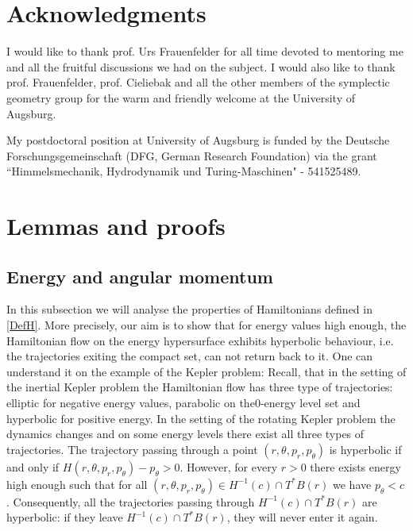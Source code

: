 \documentclass[a4paper]{amsart}
\numberwithin{equation}{section}
\begin{document}

\section*{Acknowledgments}
I would like to thank prof. Urs Frauenfelder for all time devoted to mentoring me and all the fruitful discussions we had on the subject. I would also like to thank prof. Frauenfelder, prof. Cieliebak and all the other members of the symplectic geometry group for the warm and friendly welcome at the University of Augsburg.

My postdoctoral position at University of Augsburg is funded by the Deutsche Forschungsgemeinschaft (DFG, German Research Foundation) via the grant ``Himmelsmechanik, Hydrodynamik und Turing-Maschinen" - 541525489.


\section{Lemmas and proofs}
\subsection{Energy and angular momentum}\label{ssec:E&P}

In this subsection we will analyse the properties of Hamiltonians defined in \eqref{DefH}. More precisely, our aim is to show that for energy values high enough, the Hamiltonian flow on the energy hypersurface exhibits hyperbolic behaviour, i.e. the trajectories exiting the compact set, can not return back to it. One can understand it on the example of the Kepler problem: Recall, that in the setting of the inertial Kepler problem the Hamiltonian flow has three type of trajectories: elliptic for negative energy values, parabolic on the\linebreak $0$-energy level set and hyperbolic for positive energy. In the setting of the rotating Kepler problem the dynamics changes and on some energy levels there exist all three types of trajectories. The trajectory passing through a point $(r, \theta, p_r, p_\theta)$ is hyperbolic if and only if $H(r, \theta, p_r, p_\theta)-p_\theta>0$. However, for every $r>0$ there exists energy high enough such that for all $(r, \theta, p_r, p_\theta)\in H^{-1}(c)\cap T^*B(r)$ we have $p_\theta<c$. Consequently, all the trajectories passing through $H^{-1}(c)\cap T^*B(r)$ are hyperbolic: if they leave $H^{-1}(c)\cap T^*B(r)$, they will never enter it again.
\end{document}
